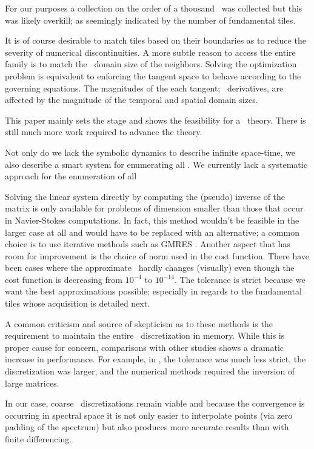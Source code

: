 For our purposes a collection on the order of a thousand \twots\
was collected but this was likely overkill; as seemingly indicated by the number
of fundamental tiles.

It is of course desirable to match tiles based on their boundaries as to reduce the severity of numerical
discontinuities. A more subtle reason to access the entire family is to match the
\spt\ domain size of the neighbors. Solving the optimization problem is equivalent
to enforcing the tangent space to behave according to the governing equations.
The magnitudes of the each tangent; \spt\ derivatives, are affected by the magnitude
of the temporal and spatial domain sizes.

This paper mainly sets the stage and shows the feasibility for a \spt\ theory. There
is still much more work required to advance the theory.

Not only do we lack the symbolic
dynamics to describe infinite space-time, we also describe a smart system for enumerating all
\twots.
We currently lack a systematic approach for the enumeration of all

Solving the linear system directly by computing the (pseudo) inverse
of the matrix
is only available for problems of dimension smaller than those that
occur in Navier-Stokes
computations. In fact, this method wouldn't be feasible in the larger
case at all and
would have to be replaced with an alternative; a common choice is to
use iterative
methods such as GMRES . Another aspect that has room for
improvement is
the choice of norm used in the cost function. There have been cases
where the
approximate \twot\ hardly changes (visually) even though the cost
 function is
decreasing from $10^{-4}$ to $10^{-14}$. The tolerance is strict
because we want
the best approximations possible; especially in regards to the
fundamental tiles
whose acquisition is detailed next.

A common criticism and source of skepticism as to these methods
is the requirement
to maintain the entire \spt\ discretization in memory. While this
 is proper cause for
concern, comparisons with other studies shows a dramatic increase
in performance.
For example, in , the tolerance was much less strict,
 the discretization
was larger, and the numerical methods required the inversion of
large matrices.

In our case, coarse \spt\ discretizations remain viable and
because the convergence is
occurring in spectral space it is not only easier to interpolate
 points (via zero padding of
the spectrum) but also produces more accurate results than with
 finite differencing.
